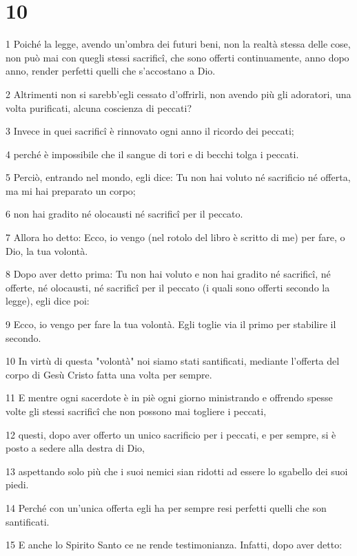\chapter{10}

\par 1 Poiché la legge, avendo un'ombra dei futuri beni, non la realtà stessa delle cose, non può mai con quegli stessi sacrificî, che sono offerti continuamente, anno dopo anno, render perfetti quelli che s'accostano a Dio.
\par 2 Altrimenti non si sarebb'egli cessato d'offrirli, non avendo più gli adoratori, una volta purificati, alcuna coscienza di peccati?
\par 3 Invece in quei sacrificî è rinnovato ogni anno il ricordo dei peccati;
\par 4 perché è impossibile che il sangue di tori e di becchi tolga i peccati.
\par 5 Perciò, entrando nel mondo, egli dice: Tu non hai voluto né sacrificio né offerta, ma mi hai preparato un corpo;
\par 6 non hai gradito né olocausti né sacrificî per il peccato.
\par 7 Allora ho detto: Ecco, io vengo (nel rotolo del libro è scritto di me) per fare, o Dio, la tua volontà.
\par 8 Dopo aver detto prima: Tu non hai voluto e non hai gradito né sacrificî, né offerte, né olocausti, né sacrificî per il peccato (i quali sono offerti secondo la legge), egli dice poi:
\par 9 Ecco, io vengo per fare la tua volontà. Egli toglie via il primo per stabilire il secondo.
\par 10 In virtù di questa "volontà" noi siamo stati santificati, mediante l'offerta del corpo di Gesù Cristo fatta una volta per sempre.
\par 11 E mentre ogni sacerdote è in piè ogni giorno ministrando e offrendo spesse volte gli stessi sacrificî che non possono mai togliere i peccati,
\par 12 questi, dopo aver offerto un unico sacrificio per i peccati, e per sempre, si è posto a sedere alla destra di Dio,
\par 13 aspettando solo più che i suoi nemici sian ridotti ad essere lo sgabello dei suoi piedi.
\par 14 Perché con un'unica offerta egli ha per sempre resi perfetti quelli che son santificati.
\par 15 E anche lo Spirito Santo ce ne rende testimonianza. Infatti, dopo aver detto:
